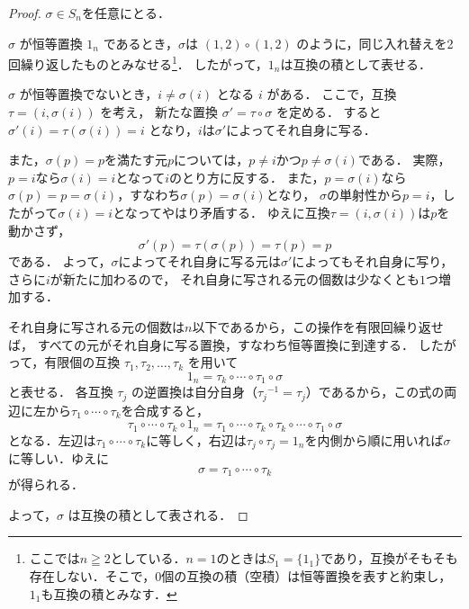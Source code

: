 \begin{tleftbar}
  \begin{proof}
     $\sigma \in S_n$を任意にとる．

     $\sigma$ が恒等置換 $1_n$ であるとき，$\sigma$は $(1, 2) \circ (1, 2)$ のように，同じ入れ替えを2回繰り返したものとみなせる\footnote{ここでは$n \geqq 2$としている．$n = 1$のときは$S_1 = \{1_1\}$であり，互換がそもそも存在しない．そこで，$0$個の互換の積（空積）は恒等置換を表すと約束し，$1_1$も互換の積とみなす．}．
     したがって，$1_n$は互換の積として表せる．
     
    $\sigma$ が恒等置換でないとき，$i \ne \sigma(i)$ となる $i$ がある．
    ここで，互換 $\tau = (i, \sigma(i))$ を考え，
    新たな置換 $\sigma' = \tau \circ \sigma$ を定める．
    すると$\sigma'(i) = \tau(\sigma(i)) = i$ となり，$i$は$\sigma'$によってそれ自身に写る．

    また，$\sigma(p) = p$を満たす元$p$については，$p \ne i$かつ$p \ne \sigma(i)$である．
    実際，$p = i$なら$\sigma(i) = i$となって$i$のとり方に反する．
    また，$p = \sigma(i)$なら$\sigma(p) = p = \sigma(i)$，すなわち$\sigma(p) = \sigma(i)$となり，
    $\sigma$の単射性から$p = i$，したがって$\sigma(i) = i$となってやはり矛盾する．
    ゆえに互換$\tau = (i, \sigma(i))$は$p$を動かさず，
    \[
      \sigma'(p) = \tau(\sigma(p)) = \tau(p) = p
    \]
    である．
    よって，$\sigma$によってそれ自身に写る元は$\sigma'$によってもそれ自身に写り，さらに$i$が新たに加わるので，
    それ自身に写される元の個数は少なくとも$1$つ増加する．

    それ自身に写される元の個数は$n$以下であるから，この操作を有限回繰り返せば，
    すべての元がそれ自身に写る置換，すなわち恒等置換に到達する．
    したがって，有限個の互換 $\tau_1, \tau_2, \dots, \tau_k$ を用いて
    \[
      1_n = \tau_k \circ \cdots \circ \tau_1 \circ \sigma
    \]
    と表せる．
    各互換 $\tau_j$ の逆置換は自分自身（${\tau_j}^{-1} = \tau_j$）であるから，この式の両辺に左から$\tau_1 \circ \cdots \circ \tau_k$を合成すると，
    \[
      \tau_1 \circ \cdots \circ \tau_k \circ 1_n
      = \tau_1 \circ \cdots \circ \tau_k \circ \tau_k \circ \cdots \circ \tau_1 \circ \sigma
    \]
    となる．左辺は$\tau_1 \circ \cdots \circ \tau_k$に等しく，右辺は$\tau_j \circ \tau_j = 1_n$を内側から順に用いれば$\sigma$に等しい．ゆえに
    \[
      \sigma = \tau_1 \circ \cdots \circ \tau_k
    \]
    が得られる．

    よって，$\sigma$ は互換の積として表される．
  \end{proof}
\end{tleftbar}

